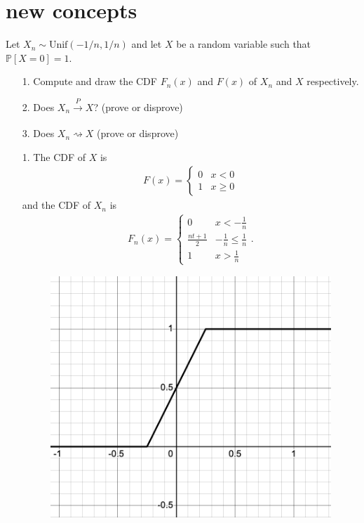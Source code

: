 \documentclass[a4paper]{article}
\begin{document}
\section{new concepts}
\begin{Exercise}
	Let $X_n \sim \text{Unif}(-1/n, 1/n)$ and let $X$ be a random variable such that $\mathbb{P}[X = 0] = 1.$
	\begin{itemize}
		\item[1.] Compute and draw the CDF $F_n(x)$ and $F(x)$ of $X_n$ and $X$ respectively.
		\item[2.] Does $X_n \xrightarrow[]{P} X$? (prove or disprove)
		\item[3.] Does $X_n \rightsquigarrow X$ (prove or disprove)
	\end{itemize}
\end{Exercise}
\begin{Solution}
	\begin{itemize}
		\item[1.] The CDF of $X$ is \begin{align*} F(x) = 
				\begin{cases}
					0 & x < 0 \\ 
					1 & x \ge 0
				\end{cases}
			\end{align*}
			and the CDF of $X_n$ is
			\begin{align*}
				F_n(x) = \begin{cases}
					0 & x < -\frac{1}{n} \\
					\frac{nt + 1}{2} & -\frac{1}{n} \le \frac{1}{n} \\
					1 & x> \frac{1}{n}
				\end{cases}.
			\end{align*}
		\begin{figure}[t]
			\centering
			\includegraphics[scale=0.5]{f1}

\end{figure}
\end{itemize}
\end{Solution}
\end{document}

